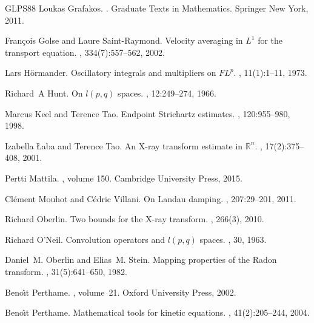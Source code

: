 \documentclass[11pt,a4paper,reqno]{amsart}
\theoremstyle{plain}
\theoremstyle{remark}
\begin{document}
\begin{thebibliography}{GLPS88}
Loukas Grafakos.
.
\newblock Graduate Texts in Mathematics. Springer New York, 2011.

Fran{\c{c}}ois Golse and Laure Saint-Raymond.
\newblock Velocity averaging in {$L^1$} for the transport equation.
, 334(7):557--562, 2002.

Lars H{\"o}rmander.
\newblock Oscillatory integrals and multipliers on {$FL^p$}.
, 11(1):1--11, 1973.

Richard~A Hunt.
\newblock On $l(p, q)$ spaces.
, 12:249--274, 1966.

Marcus Keel and Terence Tao.
\newblock Endpoint {S}trichartz estimates.
, 120:955--980, 1998.

Izabella {\L}aba and Terence Tao.
\newblock An {X}-ray transform estimate in $\mathbb{R}^n$.
, 17(2):375--408, 2001.

Pertti Mattila.
, volume 150.
\newblock Cambridge University Press, 2015.

Cl{\'e}ment Mouhot and C{\'e}dric Villani.
\newblock On {L}andau damping.
, 207:29--201, 2011.

Richard Oberlin.
\newblock Two bounds for the {X}-ray transform.
, 266(3), 2010.

Richard O'Neil.
\newblock Convolution operators and $l(p,q)$ spaces.
, 30, 1963.

Daniel~M. Oberlin and Elias~M. Stein.
\newblock Mapping properties of the {R}adon transform.
, 31(5):641--650, 1982.

Beno{\^\i}t Perthame.
, volume~21.
\newblock Oxford University Press, 2002.

Beno{\^\i}t Perthame.
\newblock Mathematical tools for kinetic equations.
, 41(2):205--244, 2004.


\end{thebibliography}
\end{document}
